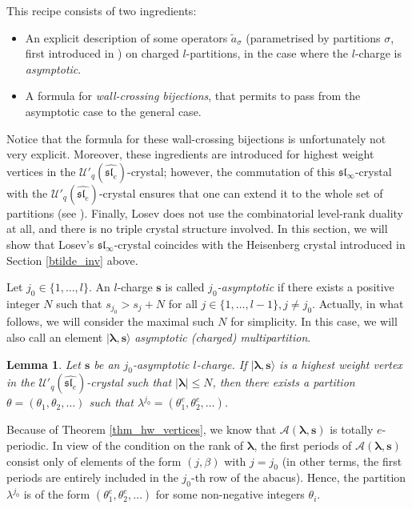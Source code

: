 \documentclass[twoside,12pt]{amsart}
\theoremstyle{plain}
\newcommand{\fl}{\mathfrak{l}}
\newcommand{\fs}{\mathfrak{s}}
\newcommand{\cA}{\mathcal{A}}
\newcommand{\bs}{\mathbf{s}}
\newcommand{\be}{\beta}
\newcommand{\si}{\sigma}
\newcommand{\la}{\lambda}
\newcommand{\bla}{\boldsymbol{\la}}
\newcommand{\ta}{\tilde{a}}
\newcommand{\Ue}{\mathcal{U}'_q (\widehat{\mathfrak{sl}_e})}
\newtheorem{lem}[num]{Lemma}
\theoremstyle{remark}
\begin{document}
This recipe consists of two ingredients:
\begin{itemize}
 \item An explicit description of some operators $\ta_\si$ 
 (parametrised by partitions $\si$, first introduced in \cite{ShanVasserot2012}) 
 on charged $l$-partitions, in the case where the $l$-charge is \textit{asymptotic}.
 \item A formula for \textit{wall-crossing bijections}, that permits to pass from the asymptotic case to the general case.
\end{itemize}
Notice that the formula for these wall-crossing bijections is unfortunately not very explicit.
Moreover, these ingredients are introduced for highest weight vertices in the $\Ue$-crystal;
however, the commutation of this $\fs\fl_\infty$-crystal with the $\Ue$-crystal
ensures that one can extend it to the whole set of partitions (see \cite[Remark 5.4]{Losev2015}).
Finally, Losev does not use the combinatorial level-rank duality at all, and there is no triple crystal structure involved.
In this section, we will show that Losev's $\fs\fl_\infty$-crystal coincides with the Heisenberg crystal introduced in Section \ref{btilde_inv} above.

\medskip

Let $j_0\in\{1,\dots,l\}$. An $l$-charge $\bs$ is called \textit{$j_0$-asymptotic}
if there exists a positive integer $N$ such that $s_{j_0} > s_j+N$ for all $j\in\{1,\dots,l-1\}, j\neq j_0$.
Actually, in what follows, we will consider the maximal such $N$ for simplicity.
In this case, we will also call an element $|\bla,\bs\rangle$ \textit{asymptotic (charged) multipartition}.

\begin{lem}\label{lemosev}
Let $\bs$ be an $j_0$-asymptotic $l$-charge.
If $|\bla,\bs\rangle$ is a highest weight vertex in the $\Ue$-crystal such that $|\bla|\leq N$, 
then there exists a partition $\theta=(\theta_1,\theta_2,\dots)$ such that
$\la^{j_0} = (\theta_1^e,\theta_2^e,\dots)$.
\end{lem}

\proof
Because of Theorem \ref{thm_hw_vertices}, we know that $\cA(\bla,\bs)$ is totally $e$-periodic.
In view of the condition on the rank of $\bla$, the first periods of $\cA(\bla,\bs)$ consist
only of elements of the form $(j,\be)$ with $j=j_0$ (in other terms, the first
periods are entirely included in the $j_0$-th row of the abacus).
Hence, the partition $\la^{j_0}$ is of the form $(\theta_1^e,\theta_2^e,\dots)$ for some non-negative integers $\theta_i$.
\endproof
\end{document}

